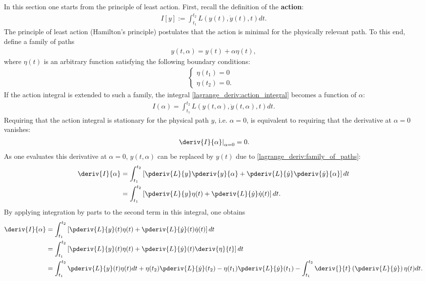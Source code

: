     In this section one starts from the principle of least action. First, recall the definition of the \textbf{action}:
    \begin{gather}
        \label{lagrange_deriv:action_integral}
        I[y] := \int_{t_1}^{t_2}L\left(y(t),\dot{y}(t),t\right)dt.
    \end{gather}
    The principle of least action (Hamilton's principle) postulates that the action is minimal for the physically relevant path. To this end, define a family of paths
    \begin{gather}
        \label{lagrange_deriv:family_of_paths}
        y(t,\alpha) = y(t) + \alpha\eta(t),
    \end{gather}
    where $\eta(t)$ is an arbitrary function satisfying the following boundary conditions:
    \begin{gather}
        \begin{cases}
        \eta(t_1) = 0&\\
        \eta(t_2) = 0.&
        \end{cases}
    \end{gather}
    If the action integral is extended to such a family, the integral \eqref{lagrange_deriv:action_integral} becomes a function of $\alpha$:
    \begin{gather}
        \label{lagrange_deriv:action_integral_over_family}
        I(\alpha) = \int_{t_1}^{t_2}L\left(y(t,\alpha),\dot{y}(t,\alpha),t\right)dt.
    \end{gather}
    Requiring that the action integral is stationary for the physical path $y$, i.e. $\alpha=0$, is equivalent to requiring that the derivative at $\alpha=0$ vanishes:
    \begin{gather}
        \label{lagrange_deriv:stationary_condition}
        \left.\deriv{I}{\alpha}\right|_{\alpha=0} = 0.
    \end{gather}
    As one evaluates this derivative at $\alpha = 0$, $y(t,\alpha)$ can be replaced by $y(t)$ due to \eqref{lagrange_deriv:family_of_paths}:
    \begin{align}
        \deriv{I}{\alpha}&=\int_{t_1}^{t_2}\left[\pderiv{L}{y}\pderiv{y}{\alpha} + \pderiv{L}{\dot{y}}\pderiv{\dot{y}}{\alpha}\right]dt\nonumber\\
        &=\int_{t_1}^{t_2}\left[\pderiv{L}{y}\eta(t) + \pderiv{L}{\dot{y}}\dot{\eta}(t)\right]dt.
    \end{align}
    By applying integration by parts to the second term in this integral, one obtains
    \begin{align}
        \deriv{I}{\alpha}&=\int_{t_1}^{t_2}\left[\pderiv{L}{y}(t)\eta(t) + \pderiv{L}{\dot{y}}(t)\dot{\eta}(t)\right]dt\nonumber\\
        &=\int_{t_1}^{t_2}\left[\pderiv{L}{y}(t)\eta(t) + \pderiv{L}{\dot{y}}(t)\deriv{\eta}{t}\right]dt\nonumber\\
        &=\int_{t_1}^{t_2}\pderiv{L}{y}(t)\eta(t)dt + \eta(t_2)\pderiv{L}{\dot{y}}(t_2) - \eta(t_1)\pderiv{L}{\dot{y}}(t_1) - \int_{t_1}^{t_2}\deriv{}{t}\left(\pderiv{L}{\dot{y}}\right)\eta(t)dt.
    \end{align}
